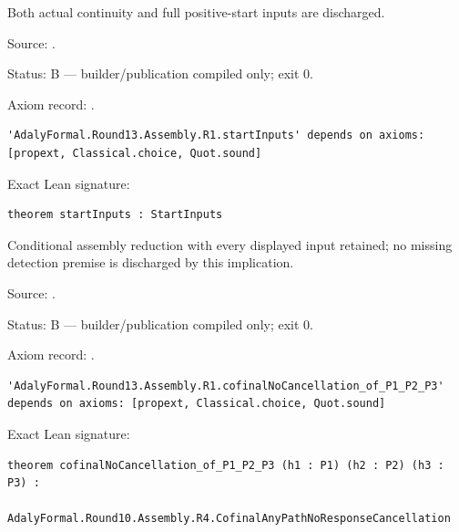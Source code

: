 \begin{theorem}[bp-568]
\label{bp-568}
\leanok
Both actual continuity and full positive-start inputs are discharged.

\par Source: \texttt{}.
\par Status: B — builder/publication compiled only; exit 0.
\par Axiom record: \texttt{}.
\begin{verbatim}
'AdalyFormal.Round13.Assembly.R1.startInputs' depends on axioms: [propext, Classical.choice, Quot.sound]
\end{verbatim}
\par Exact Lean signature:
\begin{verbatim}
theorem startInputs : StartInputs
\end{verbatim}
\end{theorem}

\begin{theorem}[bp-569]
\label{bp-569}
\leanok
Conditional assembly reduction with every displayed input retained; no missing detection premise is discharged by this implication.

\par Source: \texttt{}.
\par Status: B — builder/publication compiled only; exit 0.
\par Axiom record: \texttt{}.
\begin{verbatim}
'AdalyFormal.Round13.Assembly.R1.cofinalNoCancellation_of_P1_P2_P3' depends on axioms: [propext, Classical.choice, Quot.sound]
\end{verbatim}
\par Exact Lean signature:
\begin{verbatim}
theorem cofinalNoCancellation_of_P1_P2_P3 (h1 : P1) (h2 : P2) (h3 : P3) :
    AdalyFormal.Round10.Assembly.R4.CofinalAnyPathNoResponseCancellation
\end{verbatim}
\end{theorem}

